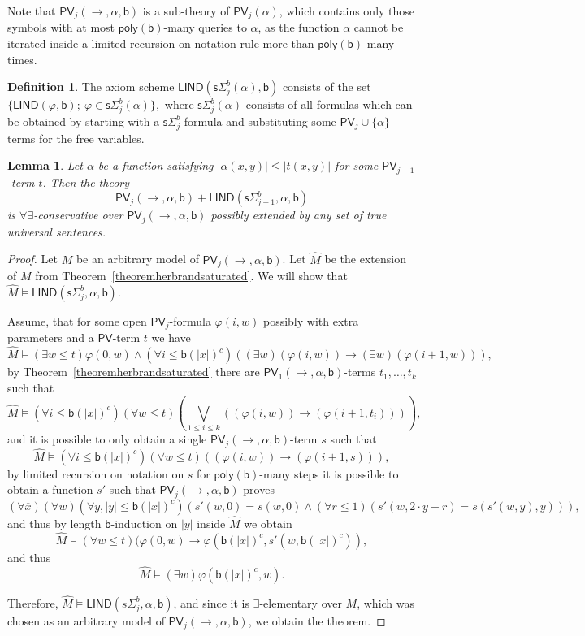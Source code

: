 \documentclass[11pt]{article}
\newcommand{\poly}{\mathsf{poly}}
\newcommand{\PV}{\mathsf{PV}}
\newcommand{\bd}{\mathsf{b}}
\newcommand{\abs}[1]{\lvert #1 \rvert}
\newtheorem{lemma}[theorem]{Lemma}
\theoremstyle{definition}
\theoremstyle{definition}
\newtheorem{definition}[theorem]{Definition}
\theoremstyle{remark}
\begin{document}
Note that $\PV_j(\to,\alpha,\bd)$ is a sub-theory of $\PV_j(\alpha)$, which contains only those symbols with at most $\poly(\bd)$-many queries to $\alpha$, as the function $\alpha$ cannot be iterated inside a limited recursion on notation rule more than $\poly(\bd)$-many times.


\begin{definition}
    The axiom scheme $\mathsf{LIND}(\mathsf{s}\Sigma^b_{j}(\alpha),\bd)$ consists of the set $\{\mathsf{LIND}(\varphi,\bd);\:\varphi\in\mathsf{s}\Sigma^b_j(\alpha)\},$
    where $\mathsf{s}\Sigma^b_j(\alpha)$ consists of all formulas which can be obtained by starting with a $\mathsf{s}\Sigma^b_j$-formula and substituting some $\PV_j\cup\{\alpha\}$-terms for the free variables.
\end{definition}

\begin{lemma}\label{lemmapvllind}
    Let $\alpha$ be a function satisfying $\abs{\alpha(x,y)}\leq \abs{t(x,y)}$ for some $\PV_{j+1}$-term $t$. Then the theory \[\PV_j(\to,\alpha,\bd)+\mathsf{LIND}(\mathsf{s}\Sigma^b_{j+1},\alpha,\bd)\] is $\forall\exists$-conservative over $\PV_j(\to,\alpha,\bd)$ possibly extended by any set of true universal sentences.
\end{lemma}
\begin{proof}
    Let $M$ be an arbitrary model of $\PV_j(\to,\alpha,\bd)$. Let  $\hat M$ be the extension of $M$ from Theorem~\ref{theoremherbrandsaturated}. We will show that $\hat M\models \mathsf{LIND}(\mathsf{s}\Sigma^b_j,\alpha,\bd)$.

    Assume, that for some open $\PV_j$-formula $\varphi(i,w)$ possibly with extra parameters and a $\PV$-term $t$ we have
    \[\hat M \models (\exists w\leq t)\varphi(0,w) \land (\forall i\leq \bd(\abs{x})^c)((\exists w)(\varphi(i,w))\to (\exists w)(\varphi(i+1,w))),\]
    by Theorem~\ref{theoremherbrandsaturated} there are $\PV_1(\to,\alpha,\bd)$-terms $t_1,\dots,t_k$ such that
    \[\hat M \models (\forall i\leq \bd(\abs{x})^c)(\forall w\leq t)(\bigvee_{1\leq i\leq k}((\varphi(i,w))\to (\varphi(i+1,t_i)))),\]
    and it is possible to only obtain a single $\PV_j(\to,\alpha,\bd)$-term $s$ such that 
    \[\hat M \models (\forall i\leq \bd(\abs{x})^c)(\forall w\leq t)((\varphi(i,w))\to (\varphi(i+1,s))),\]
    by limited recursion on notation on $s$ for $\poly(\bd)$-many steps it is possible to obtain a function $s'$ such that $\PV_j(\to,\alpha,\bd)$ proves
    \[(\forall \overline x)(\forall w)(\forall y, \abs{y}\leq \bd(\abs{x})^c)(s'(w,0) =s(w,0)\land (\forall r\leq 1)(s'(w,2\cdot y+r)=s(s'(w,y),y))),\]
    and thus by length $\bd$-induction on $\abs{y}$ inside $\hat M$ we obtain
    \[\hat M \models (\forall w\leq t)(\varphi(0,w)\to \varphi(\bd(\abs{x})^c,s'(w,\bd(\abs{x})^c)),\]
    and thus
    \[\hat M \models (\exists w)\varphi(\bd(\abs{x})^c,w).\]

    Therefore, $\hat M\models \mathsf{LIND}(s\Sigma^b_j,\alpha,\bd)$, and since it is $\exists$-elementary over $M$, which was chosen as an arbitrary model of $\PV_j(\to,\alpha,\bd)$, we obtain the theorem.
\end{proof}
\end{document}
